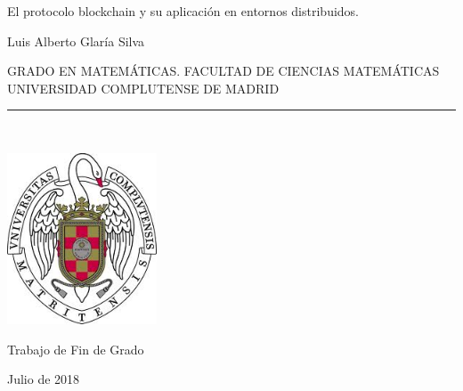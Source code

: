 \begin{center}

   \vspace{1cm}


   {\Large El protocolo blockchain y su aplicación en entornos distribuidos.}\\

   \vspace{0.5cm}



   \vspace{0.5cm}



   {\large Luis Alberto Glaría Silva}\\

   \vspace{0.5cm}




   GRADO EN MATEMÁTICAS. FACULTAD DE CIENCIAS MATEMÁTICAS\\
   UNIVERSIDAD COMPLUTENSE DE MADRID \\


   \vspace{0.65cm}
   \rule{2in}{0.5pt}\\
   \vspace{0.85cm}

  \includegraphics[height=2in]{figures/escudo.jpg}
  

   \vspace{0.5cm}
Trabajo de Fin de Grado

   \vspace{0.5cm}






  Julio de 2018\\
   \vspace{1cm}

\end{center}

